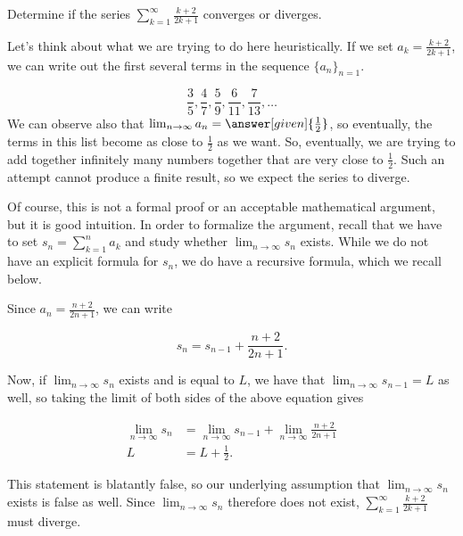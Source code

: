 \documentclass{ximera}
\begin{document}
\begin{example}
Determine if the series $\sum_{k=1}^{\infty} \frac{k+2}{2k+1}$ converges or diverges.  

\begin{explanation}
Let's think about what we are trying to do here heuristically.  If we set $a_k =  \frac{k+2}{2k+1}$, we can write out the first several terms in the sequence $\{a_n\}_{n=1}$.

\[
\frac{3}{5}, \frac{4}{7}, \frac{5}{9}, \frac{6}{11},\frac{7}{13}, \ldots
\]
We can observe also that $\lim_{n \to \infty} a_n = \answer[given]{\frac{1}{2}}$, so eventually, the terms in this list become as close to $\frac{1}{2}$ as we want.  So, eventually, we are trying to add together infinitely many numbers together that are very close to $\frac{1}{2}$.  Such an attempt cannot produce a finite result, so we expect the series to diverge.

Of course, this is not a formal proof or an acceptable mathematical argument, but it is good intuition.  In order to formalize the argument, recall that we have to set $s_n = \sum_{k=1}^n a_k$ and study whether $\lim_{n \to \infty} s_n$ exists.  While we do not have an explicit formula for $s_n$, we do have a recursive formula, which we recall below. 

\begin{image}
  \end{image}

Since $a_n = \frac{n+2}{2n+1}$, we can write

\[
s_n = s_{n-1}+\frac{n+2}{2n+1}.
\] 

Now, if $\lim_{n \to \infty} s_n$ exists and is equal to $L$, we have that $\lim_{n \to \infty} s_{n-1}=L$ as well, so taking the limit of both sides of the above equation gives

\begin{align*}
\lim_{n \to \infty} s_n &= \lim_{n \to \infty} s_{n-1}+ \lim_{n \to \infty} \frac{n+2}{2n+1} \\
L &= L +\frac{1}{2}.
\end{align*} 

This statement is blatantly false, so our underlying assumption that $\lim_{n \to \infty} s_n$ exists is false as well.  Since $\lim_{n \to \infty} s_n$ therefore does not exist,  $\sum_{k=1}^{\infty} \frac{k+2}{2k+1}$ must diverge.
\end{explanation}
\end{example}
\end{document}
